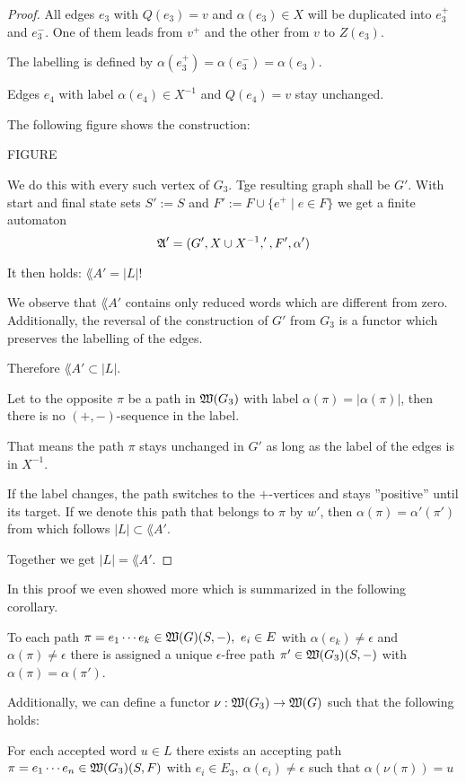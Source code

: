\begin{proof}
All edges $e_3$ with $Q(e_3) = v$ and $\alpha(e_3) \in X$ will be duplicated
into $e_3^+$ and $e_3^-$. One of them leads from $v^+$ and the other from $v$ to
$Z(e_3)$.

The labelling is defined by $\alpha(e_3^+) = \alpha(e_3^-) = \alpha(e_3)$.

Edges $e_4$ with label $\alpha(e_4) \in X^{-1}$ and $Q(e_4) = v$ stay unchanged.

The following figure shows the construction:

FIGURE

We do this with every such vertex of $G_3$. Tge resulting graph shall be $G'$.
With start and final state sets $S' := S$ and $F' := F \cup \{e^+ \mid e\in F\}$
we get a finite automaton
\[ \mbox{$\mathfrak{A}$}' = (G', X \cup X^{-1}, ', F', \alpha') \]

It then holds: $\lang{A}' = |L|$!

We observe that $\lang{A}'$ contains only reduced words which are different from
zero. Additionally, the reversal of the construction of $G'$ from $G_3$ is a
functor which preserves the labelling of the edges.

Therefore $\lang{A}' \subset |L|$.

Let to the opposite $\pi$ be a path in $\mbox{$\mathfrak{W}(G_3)$}$ with label $\alpha(\pi)
= |\alpha(\pi)|$, then there is no $(+, -)$-sequence in the label.

That means the path $\pi$ stays unchanged in $G'$ as long as the label of the
edges is in $X^{-1}$.

If the label changes, the path switches to the $+$-vertices and stays
''positive'' until its target. If we denote this path that belongs to $\pi$ by
$w'$, then $\alpha(\pi) = \alpha'(\pi')$ from which follows $|L| \subset
\lang{A}'$.

Together we get $|L| = \lang{A'}$.
\end{proof}

In this proof we even showed more which is summarized in the following
corollary.

\begin{corollary}
To each path $\pi = e_1 \cdots e_k \in \mbox{$\mathfrak{W}(G)$}(S, -),\ e_i \in E$ with
$\alpha(e_k) \neq \epsilon$ and $\alpha(\pi) \neq \epsilon$ there is assigned a
unique $\epsilon$-free path $\pi' \in \mbox{$\mathfrak{W}(G_3)$}(S, -)$ with $\alpha(\pi) =
\alpha(\pi')$.

Additionally, we can define a functor $\nu : \mbox{$\mathfrak{W}(G_3)$} \to \mbox{$\mathfrak{W}(G)$}$ such
that the following holds:

For each accepted word $u \in L$ there exists an accepting path $\pi = e_1
\cdots e_n \in \mbox{$\mathfrak{W}(G_3)$}(S, F)$ with $e_i \in E_3,\ \alpha(e_i) \neq \epsilon$ such
that $\alpha(\nu(\pi)) = u$
\end{corollary}

